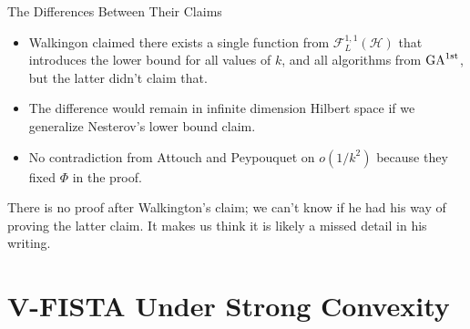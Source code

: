 \documentclass[11pt]{beamer}
\theoremstyle{definition}
\begin{document}
    \begin{frame}{The Differences Between Their Claims}
        \begin{itemize}
            \item Walkingon claimed there exists a single function from $\mathcal F_{L}^{1,1}(\mathcal H)$ that introduces the lower bound for all values of $k$, and all algorithms from $\text{GA}^{\text{1st}}$, but the latter didn't claim that. 
            \item The difference would remain in infinite dimension Hilbert space if we generalize Nesterov's lower bound claim. 
            \item No contradiction from Attouch and Peypouquet \cite{attouch_rate_2016} on $o(1/k^2)$ because they fixed $\Phi$ in the proof. 
        \end{itemize}
        There is no proof after Walkington's claim; we can't know if he had his way of proving the latter claim. 
        It makes us think it is likely a missed detail in his writing. 
    \end{frame}

 

\section{V-FISTA Under Strong Convexity}
\end{document}
